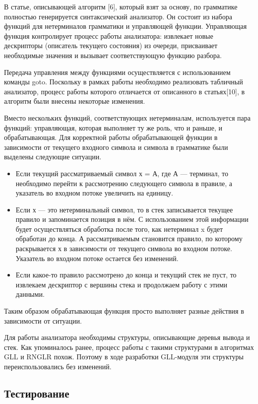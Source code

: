 \documentclass{matmex-diploma-custom}
\begin{document}
В статье, описывающей алгоритм [6], который взят за основу, по грамматике полностью генерируется синтаксический анализатор. Он состоит из набора функций для нетерминалов грамматики и управляющей функции. Управляющая функция контролирует процесс работы анализатора: извлекает новые дескрипторы (описатель текущего состояния) из очереди, присваивает необходимые значения и вызывает соответствующую функцию разбора.

Передача управления между функциями осуществляется с использованием команды goto. Поскольку в рамках работы необходимо реализовать табличный анализатор,  процесс работы которого отличается от описанного в статьях[10], в алгоритм были внесены некоторые изменения.

Вместо нескольких функций, соответствующих нетерминалам, используется пара функций: управляющая, которая выполняет ту же роль, что  и раньше,  и обрабатывающая. Для корректной работы обрабатывающей функции в зависимости от текущего входного символа и символа в грамматике были выделены следующие ситуации.

\begin{itemize}
\item Если текущий рассматриваемый символ х = А, где А — терминал, то необходимо перейти к рассмотрению следующего символа в правиле, а указатель во входном потоке увеличить на единицу.
\item Если х — это нетерминальный символ, то в стек записывается текущее правило и запоминается позиция в нём. С использованием этой информации будет осуществляться обработка после того, как нетерминал x будет обработан до конца. А рассматриваемым становится правило, по которому раскрывается х в зависимости от текущего символа во входном потоке. Указатель во входном потоке остается без изменений.
\item Если какое-то правило рассмотрено до конца и текущий стек не пуст, то извлекаем дескриптор с вершины стека и продолжаем работу с этими данными.
\end{itemize}

Таким образом обрабатывающая функция просто выполняет разные действия в зависимости от ситуации.

Для работы анализатора необходимы структуры, описывающие деревья вывода и стек. Как упоминалось ранее, процесс работы с такими структурами в алгоритмах GLL и RNGLR похож. Поэтому в ходе разработки GLL-модуля эти структуры переиспользовались без изменений. 

\subsection{Тестирование}
\end{document}
